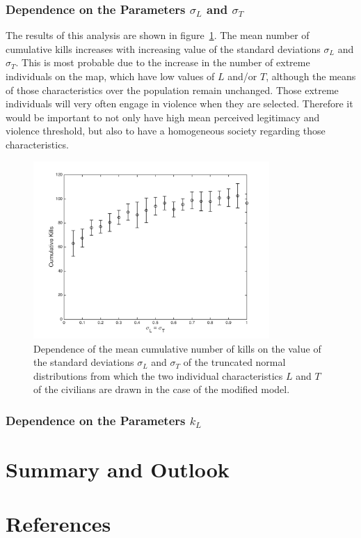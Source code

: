 \documentclass[11pt]{article}
\begin{document}
\subsubsection{Dependence on the Parameters $\sigma_L$ and $\sigma_T$}
The results of this analysis are shown in figure~\ref{fig:L_T_std_dep}. The mean number of cumulative kills increases with increasing value of the standard deviations $\sigma_L$ and $\sigma_T$. This is most probable due to the increase in the number of extreme individuals on the map, which have low values of $L$ and/or $T$, although the means of those characteristics over the population remain unchanged. Those extreme individuals will very often engage in violence when they are selected. Therefore it would be important to not only have high mean perceived legitimacy and violence threshold, but also to have a homogeneous society regarding those characteristics.
\begin{figure}[!htbp]
	\centering
		\includegraphics[width=0.80\textwidth]{../../code/modified_model/L_T_std_dep.png}
	\caption{Dependence of the mean cumulative number of kills on the value of the standard deviations $\sigma_L$ and $\sigma_T$ of the truncated normal distributions from which the two individual characteristics $L$ and $T$ of the civilians are drawn in the case of the modified model.}
	\label{fig:L_T_std_dep}
\end{figure}

\subsubsection{Dependence on the Parameters $k_L$}

\section{Summary and Outlook}

\section{References}
\end{document}
